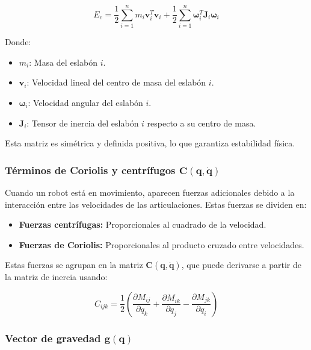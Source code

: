 \begin{equation}
	E_c = \frac{1}{2} \sum_{i=1}^{n} m_i \mathbf{v}_i^T \mathbf{v}_i + \frac{1}{2} \sum_{i=1}^{n} \boldsymbol{\omega}_i^T \mathbf{J}_i \boldsymbol{\omega}_i
\end{equation}

Donde:

\begin{itemize}
	\item \( m_i \): Masa del eslabón \( i \).
	\item \( \mathbf{v}_i \): Velocidad lineal del centro de masa del eslabón \( i \).
	\item \( \boldsymbol{\omega}_i \): Velocidad angular del eslabón \( i \).
	\item \( \mathbf{J}_i \): Tensor de inercia del eslabón \( i \) respecto a su centro de masa.
\end{itemize}

Esta matriz es simétrica y definida positiva, lo que garantiza estabilidad física.

\subsubsection{Términos de Coriolis y centrífugos \( \mathbf{C}(\mathbf{q}, \dot{\mathbf{q}}) \)}

Cuando un robot está en movimiento, aparecen fuerzas adicionales debido a la interacción entre las velocidades de las articulaciones. Estas fuerzas se dividen en:

\begin{itemize}
	\item \textbf{Fuerzas centrífugas:} Proporcionales al cuadrado de la velocidad.
	\item \textbf{Fuerzas de Coriolis:} Proporcionales al producto cruzado entre velocidades.
\end{itemize}

Estas fuerzas se agrupan en la matriz \( \mathbf{C}(\mathbf{q}, \dot{\mathbf{q}}) \), que puede derivarse a partir de la matriz de inercia usando:

\begin{equation}
	C_{ijk} = \frac{1}{2} \left( \frac{\partial M_{ij}}{\partial q_k} + \frac{\partial M_{ik}}{\partial q_j} - \frac{\partial M_{jk}}{\partial q_i} \right)
\end{equation}

\subsubsection{Vector de gravedad \( \mathbf{g}(\mathbf{q}) \)}

